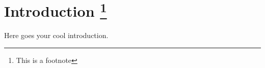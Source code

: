 \renewcommand{\thefootnote}{\arabic{footnote}}
\section*{Introduction \footnote[1]{This is a footnote}}
Here goes your cool introduction.

